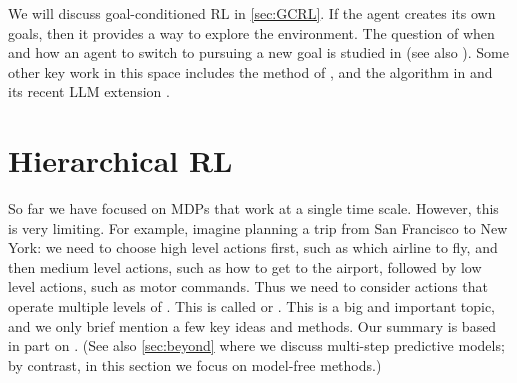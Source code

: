 We will discuss goal-conditioned RL
in \cref{sec:GCRL}. If the agent creates its own goals,
then it provides a way to explore the environment.
The question of when and how an agent to switch to pursuing
a new goal is studied in \citep{Pislar2022}
(see also \citep{Bagaria2023}).
Some other key work in this space includes
the 
method of \citep{Riedmiller2018},
and
the  algorithm in 
\citep{Ecoffet2019,Ecoffet2021}
and its recent LLM extension \citep{Lu2024go}.






\section{Hierarchical RL}
\label{sec:HRL}


So far we have focused on MDPs that work at a single time scale.
However, this is very limiting.
For example, imagine planning a trip from San Francisco to New York:
we need to choose high level actions first, such as which airline to fly,
and then medium level actions, such as how to get to the airport,
followed by low level actions, such as motor commands.
Thus we need to consider actions that operate multiple levels
of .
This is called  or .
This is a big and important topic,
and we only brief mention a few key ideas and methods.
Our summary is based in part on 
\citep{Pateria2022}.
(See also \cref{sec:beyond} where we discuss multi-step
predictive models; by contrast, in this section we focus
on model-free methods.)

